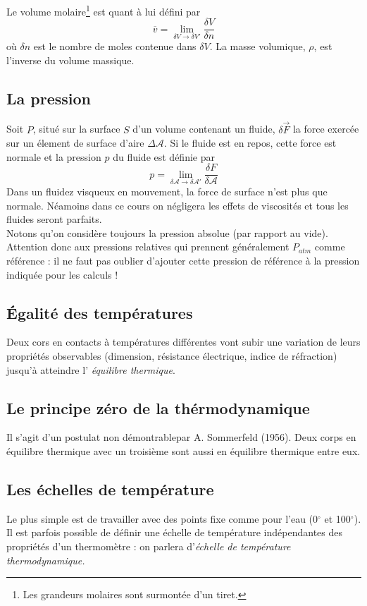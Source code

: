 	Le volume molaire\footnote{Les grandeurs molaires sont surmontée d'un 
	tiret.} est quant à lui défini par
	\begin{equation}
	\overline{v} = \lim\limits_{\delta V \rightarrow \delta V'} \frac{
	\delta V}{\delta n}
	\end{equation}
	où $\delta n$ est le nombre de moles contenue dans $\delta V$. La 
	masse volumique, $\rho$, est l'inverse du volume massique.
	
	
	\subsection{La pression}
	Soit $P$, situé sur la surface $S$ d'un volume contenant un fluide, 
	$\delta \vec F$ la force exercée sur un élement de surface d'aire 
	$\Delta \mathcal{A}$. Si le fluide est en repos, cette force est 
	normale et la pression $p$ du fluide est définie par
	\begin{equation}
	p = \lim\limits_{\delta\mathcal{A}\rightarrow\delta\mathcal{A}'} 
	\frac{\delta F}{\delta \mathcal{A}}
	\end{equation}		
	Dans un fluidez visqueux en mouvement, la force de surface n'est 
	plus que normale. Néamoins dans ce cours on négligera les effets 
	de viscosités et tous les fluides seront parfaits.\\
	Notons qu'on considère toujours la pression absolue (par rapport 
	au vide). Attention donc aux pressions relatives qui prennent 
	généralement $P_{atm}$ comme référence : il ne faut pas oublier 
	d'ajouter cette pression de référence à la pression indiquée 
	pour les calculs !
	
	
	\subsection{Égalité des températures}
	Deux cors en contacts à températures différentes vont subir une 
	variation de leurs propriétés observables (dimension, résistance 
	électrique, indice de réfraction) jusqu'à atteindre l'\textit{
	équilibre thermique}.
	
	\subsection{Le principe zéro de la thérmodynamique}
	Il s'agit d'un postulat non démontrablepar A. Sommerfeld (1956). 
	Deux corps en équilibre thermique avec un troisième sont aussi 
	en équilibre thermique entre eux.
	
	\subsection{Les échelles de température}
	Le plus simple est de travailler avec des points fixe comme pour 
	l'eau (0$^\circ$ et 100$^\circ$). Il est parfois possible de 
	définir une échelle de température indépendantes des propriétés 
	d'un thermomètre : on parlera d'\textit{échelle de température 
	thermodynamique.}
	
	
	
	
	
	
	
	
	
	
	
	
	
	
	
	
	
	
	
	
	
	
	
	
	
